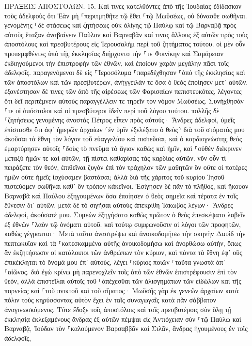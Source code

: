 \documentclass[twoside, 9pt]{extreport}
\begin{document}
ΠΡΑΞΕΙΣ ΑΠΟΣΤΟΛΩΝ.
15.
Καί τινες κατελθόντες ἀπὸ τῆς Ἰουδαίας ἐδίδασκον τοὺς ἀδελφοὺς ὅτι Ἐὰν μὴ ⸀περιτμηθῆτε τῷ ἔθει ⸀τῷ Μωϋσέως, οὐ δύνασθε σωθῆναι. 
γενομένης ⸀δὲ στάσεως καὶ ζητήσεως οὐκ ὀλίγης τῷ Παύλῳ καὶ τῷ Βαρναβᾷ πρὸς αὐτοὺς ἔταξαν ἀναβαίνειν Παῦλον καὶ Βαρναβᾶν καί τινας ἄλλους ἐξ αὐτῶν πρὸς τοὺς ἀποστόλους καὶ πρεσβυτέρους εἰς Ἰερουσαλὴμ περὶ τοῦ ζητήματος τούτου. 
οἱ μὲν οὖν προπεμφθέντες ὑπὸ τῆς ἐκκλησίας διήρχοντο τήν ⸀τε Φοινίκην καὶ Σαμάρειαν ἐκδιηγούμενοι τὴν ἐπιστροφὴν τῶν ἐθνῶν, καὶ ἐποίουν χαρὰν μεγάλην πᾶσι τοῖς ἀδελφοῖς. 
παραγενόμενοι δὲ εἰς ⸀Ἱεροσόλυμα ⸀παρεδέχθησαν ⸀ἀπὸ τῆς ἐκκλησίας καὶ τῶν ἀποστόλων καὶ τῶν πρεσβυτέρων, ἀνήγγειλάν τε ὅσα ὁ θεὸς ἐποίησεν μετ᾽ αὐτῶν. 
ἐξανέστησαν δέ τινες τῶν ἀπὸ τῆς αἱρέσεως τῶν Φαρισαίων πεπιστευκότες, λέγοντες ὅτι δεῖ περιτέμνειν αὐτοὺς παραγγέλλειν τε τηρεῖν τὸν νόμον Μωϋσέως. 
Συνήχθησάν ⸀τε οἱ ἀπόστολοι καὶ οἱ πρεσβύτεροι ἰδεῖν περὶ τοῦ λόγου τούτου. 
πολλῆς δὲ ⸀ζητήσεως γενομένης ἀναστὰς Πέτρος εἶπεν πρὸς αὐτούς· Ἄνδρες ἀδελφοί, ὑμεῖς ἐπίστασθε ὅτι ἀφ᾽ ἡμερῶν ἀρχαίων ⸂ἐν ὑμῖν ἐξελέξατο ὁ θεὸς⸃ διὰ τοῦ στόματός μου ἀκοῦσαι τὰ ἔθνη τὸν λόγον τοῦ εὐαγγελίου καὶ πιστεῦσαι, 
καὶ ὁ καρδιογνώστης θεὸς ἐμαρτύρησεν αὐτοῖς ⸀δοὺς τὸ πνεῦμα τὸ ἅγιον καθὼς καὶ ἡμῖν, 
καὶ ⸀οὐθὲν διέκρινεν μεταξὺ ἡμῶν τε καὶ αὐτῶν, τῇ πίστει καθαρίσας τὰς καρδίας αὐτῶν. 
νῦν οὖν τί πειράζετε τὸν θεόν, ἐπιθεῖναι ζυγὸν ἐπὶ τὸν τράχηλον τῶν μαθητῶν ὃν οὔτε οἱ πατέρες ἡμῶν οὔτε ἡμεῖς ἰσχύσαμεν βαστάσαι; 
ἀλλὰ διὰ τῆς χάριτος τοῦ κυρίου Ἰησοῦ πιστεύομεν σωθῆναι καθ᾽ ὃν τρόπον κἀκεῖνοι. 
Ἐσίγησεν δὲ πᾶν τὸ πλῆθος, καὶ ἤκουον Βαρναβᾶ καὶ Παύλου ἐξηγουμένων ὅσα ἐποίησεν ὁ θεὸς σημεῖα καὶ τέρατα ἐν τοῖς ἔθνεσιν δι᾽ αὐτῶν. 
μετὰ δὲ τὸ σιγῆσαι αὐτοὺς ἀπεκρίθη Ἰάκωβος λέγων· Ἄνδρες ἀδελφοί, ἀκούσατέ μου. 
Συμεὼν ἐξηγήσατο καθὼς πρῶτον ὁ θεὸς ἐπεσκέψατο λαβεῖν ἐξ ἐθνῶν ⸀λαὸν τῷ ὀνόματι αὐτοῦ. 
καὶ τούτῳ συμφωνοῦσιν οἱ λόγοι τῶν προφητῶν, καθὼς γέγραπται· 
Μετὰ ταῦτα ἀναστρέψω καὶ ἀνοικοδομήσω τὴν σκηνὴν Δαυὶδ τὴν πεπτωκυῖαν καὶ τὰ ⸀κατεσκαμμένα αὐτῆς ἀνοικοδομήσω καὶ ἀνορθώσω αὐτήν, 
ὅπως ἂν ἐκζητήσωσιν οἱ κατάλοιποι τῶν ἀνθρώπων τὸν κύριον, καὶ πάντα τὰ ἔθνη ἐφ᾽ οὓς ἐπικέκληται τὸ ὄνομά μου ἐπ᾽ αὐτούς, λέγει ⸀κύριος ποιῶν ⸀ταῦτα 
γνωστὰ ἀπ᾽ ⸀αἰῶνος. 
διὸ ἐγὼ κρίνω μὴ παρενοχλεῖν τοῖς ἀπὸ τῶν ἐθνῶν ἐπιστρέφουσιν ἐπὶ τὸν θεόν, 
ἀλλὰ ἐπιστεῖλαι αὐτοῖς τοῦ ⸀ἀπέχεσθαι τῶν ἀλισγημάτων τῶν εἰδώλων καὶ τῆς πορνείας καὶ ⸀τοῦ πνικτοῦ καὶ τοῦ αἵματος· 
Μωϋσῆς γὰρ ἐκ γενεῶν ἀρχαίων κατὰ πόλιν τοὺς κηρύσσοντας αὐτὸν ἔχει ἐν ταῖς συναγωγαῖς κατὰ πᾶν σάββατον ἀναγινωσκόμενος. 
Τότε ἔδοξε τοῖς ἀποστόλοις καὶ τοῖς πρεσβυτέροις σὺν ὅλῃ τῇ ἐκκλησίᾳ ἐκλεξαμένους ἄνδρας ἐξ αὐτῶν πέμψαι εἰς Ἀντιόχειαν σὺν ⸀τῷ Παύλῳ καὶ Βαρναβᾷ, Ἰούδαν τὸν ⸀καλούμενον Βαρσαββᾶν καὶ Σιλᾶν, ἄνδρας ἡγουμένους ἐν τοῖς ἀδελφοῖς, 
\end{document}

